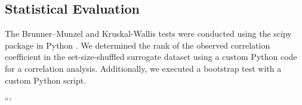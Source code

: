 \subsection{Statistical Evaluation}
The Brunner--Munzel and Kruskal-Wallis tests were conducted using the scipy package in Python \cite{virtanen_scipy_2020}. We determined the rank of the observed correlation coefficient in the set-size-shuffled surrogate dataset using a custom Python code for a correlation analysis. Additionally, we executed a bootstrap test with a custom Python script.

\label{sec:methods}
```
